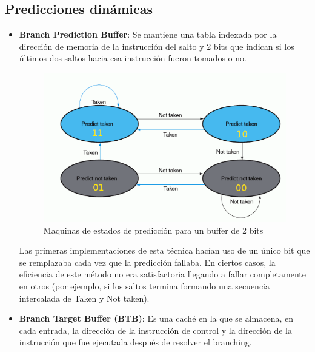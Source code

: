 \subsection{Predicciones dinámicas}

\begin{itemize}
	\item\textbf{Branch Prediction Buffer}: Se mantiene una tabla indexada por la dirección de memoria de la instrucción del salto y 2 bits que indican si los últimos dos saltos hacia esa instrucción fueron tomados o no.
	
	\begin{figure}[ht]
		\centering
		\includegraphics[width=0.7\linewidth]{imagenes/2bit-buffer-prediction}
		\caption{Maquinas de estados de predicción para un buffer de 2 bits}
		\label{fig:2bit-buffer-prediction}
	\end{figure}

	Las primeras implementaciones de esta técnica hacían uso de un único bit que se remplazaba cada vez que la predicción fallaba. En ciertos casos, la eficiencia de este método no era satisfactoria llegando a fallar completamente en otros (por ejemplo, si los saltos termina formando una secuencia intercalada de Taken y Not taken).
	
	\item \textbf{Branch Target Buffer (BTB)}: Es una caché en la que se almacena, en cada entrada, la dirección de la instrucción de control y la dirección de la instrucción que fue ejecutada después de resolver el branching.
	

\end{itemize}
